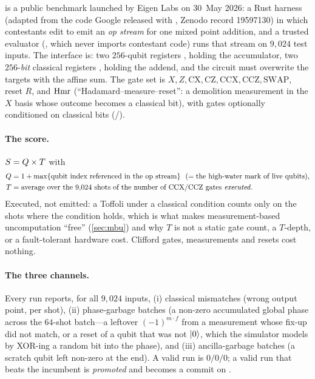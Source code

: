 \ecdsafail{} \cite{ecdsafail26} is a public benchmark launched by Eigen Labs on 30~May 2026: a Rust harness (adapted from the code Google released with \cite{babbush26}, Zenodo record \mbox{19597130}) in which contestants edit  to emit an \emph{op stream} for one mixed point addition, and a trusted evaluator (, which never imports contestant code) runs that stream on $9{,}024$ test inputs. The interface is: two $256$-qubit registers ,  holding the accumulator, two $256$-\emph{bit} classical registers ,  holding the addend, and the circuit must overwrite the targets with the affine sum. The gate set is $X,Z,\mathrm{CX},\mathrm{CZ},\mathrm{CCX},\mathrm{CCZ},\mathrm{SWAP}$, reset $R$, and $\mathrm{Hmr}$ (``Hadamard--measure--reset'': a demolition measurement in the $X$ basis whose outcome becomes a classical bit), with gates optionally conditioned on classical bits (/).

\paragraph{The score.} $S=Q\times T$ with
\begin{align*}
Q &= 1+\max\{\text{qubit index referenced in the op stream}\}\ \ (=\text{the high-water mark of live qubits}),\\
T &= \text{average over the $9{,}024$ shots of the number of CCX/CCZ gates \emph{executed}} .
\end{align*}
Executed, not emitted: a Toffoli under a classical condition counts only on the shots where the condition holds, which is what makes measurement-based uncomputation ``free'' (\cref{sec:mbu}) and why $T$ is not a static gate count, a $T$-depth, or a fault-tolerant hardware cost. Clifford gates, measurements and resets cost nothing.

\paragraph{The three channels.} Every run reports, for all $9{,}024$ inputs, (i) classical mismatches  (wrong output point, per shot), (ii) phase-garbage batches  (a non-zero accumulated global phase across the $64$-shot batch---a leftover $(-1)^{m\cdot f}$ from a measurement whose fix-up did not match, or a reset of a qubit that was not $\lvert 0 \rangle$, which the simulator models by XOR-ing a random bit into the phase), and (iii) ancilla-garbage batches  (a scratch qubit left non-zero at the end). A valid run is $0/0/0$; a valid run that beats the incumbent is \emph{promoted} and becomes a commit on .

